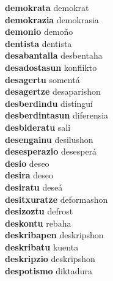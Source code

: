\textbf{demokrata } demokrat \\
\textbf{demokrazia } demokrasia \\
\textbf{demonio } demoño \\
\textbf{dentista } dentista \\
\textbf{desabantaila } desbentaha \\
\textbf{desadostasun } konflikto \\
\textbf{desagertu } somentá \\
\textbf{desagertze } desaparishon \\
\textbf{desberdindu } distinguí \\
\textbf{desberdintasun } diferensia \\
\textbf{desbideratu } sali \\
\textbf{desengainu } desilushon \\
\textbf{desesperazio } desesperá \\
\textbf{desio } deseo \\
\textbf{desira } deseo \\
\textbf{desiratu } deseá \\
\textbf{desitxuratze } deformashon \\
\textbf{desizoztu } defrost \\
\textbf{deskontu } rebaha \\
\textbf{deskribapen } deskripshon \\
\textbf{deskribatu } kuenta \\
\textbf{deskripzio } deskripshon \\
\textbf{despotismo } diktadura \\
